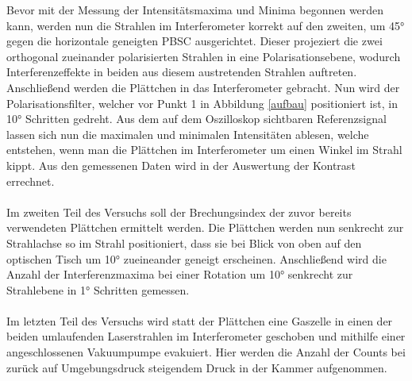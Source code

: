   Bevor mit der Messung der Intensitätsmaxima und Minima begonnen werden kann, werden nun die Strahlen im Interferometer korrekt auf den zweiten, um 45° gegen die horizontale geneigten PBSC ausgerichtet. Dieser projeziert die zwei orthogonal zueinander polarisierten Strahlen in eine Polarisationsebene, wodurch Interferenzeffekte in beiden aus diesem austretenden Strahlen auftreten.\\
  Anschließend werden die Plättchen in das Interferometer gebracht. Nun wird der Polarisationsfilter, welcher vor Punkt 1 in Abbildung \ref{aufbau} positioniert ist,
  in 10° Schritten gedreht.
	Aus dem auf dem Oszilloskop sichtbaren Referenzsignal lassen sich nun die maximalen und minimalen Intensitäten ablesen, welche entstehen, wenn
  man die Plättchen im Interferometer um einen Winkel im Strahl kippt. Aus den gemessenen Daten wird in der Auswertung der Kontrast errechnet.\\
  \\
  Im zweiten Teil des Versuchs soll der Brechungsindex der zuvor bereits verwendeten Plättchen ermittelt werden. Die Plättchen werden nun senkrecht zur Strahlachse so im Strahl positioniert, dass sie bei Blick von oben auf den optischen Tisch um 10° zueineander geneigt erscheinen.
  Anschließend wird die Anzahl der Interferenzmaxima bei einer Rotation um 10° senkrecht zur Strahlebene in 1° Schritten gemessen.\\
  \\
  Im letzten Teil des Versuchs wird statt der Plättchen eine Gaszelle in einen der beiden umlaufenden Laserstrahlen im Interferometer geschoben und mithilfe einer angeschlossenen Vakuumpumpe evakuiert.
  Hier werden die Anzahl der Counts bei zurück auf Umgebungsdruck steigendem Druck in der Kammer aufgenommen.
